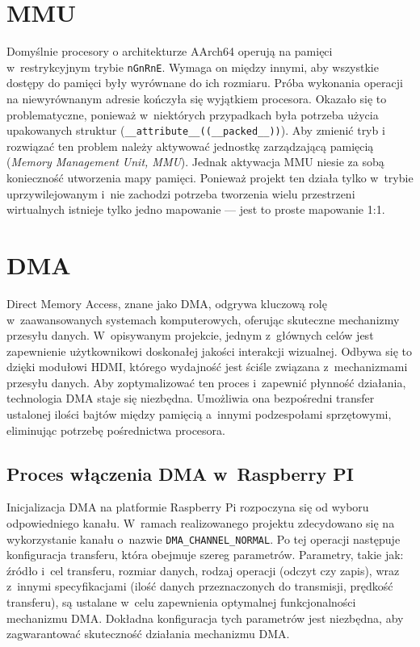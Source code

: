 \documentclass[shortabstract]{iithesis}
\begin{document}
\section{MMU}
Domyślnie procesory o architekturze AArch64 operują na pamięci w~restrykcyjnym trybie \texttt{nGnRnE}. Wymaga on między innymi, aby wszystkie dostępy do pamięci były wyrównane do ich rozmiaru. Próba wykonania operacji na niewyrównanym adresie kończyła się wyjątkiem procesora. Okazało się to problematyczne, ponieważ w~niektórych przypadkach była potrzeba użycia upakowanych struktur (\texttt{\_\_attribute\_\_((\_\_packed\_\_))}). Aby zmienić tryb i rozwiązać ten problem należy aktywować jednostkę zarządzającą pamięcią (\textit{Memory Management Unit, MMU}). Jednak aktywacja MMU niesie za sobą konieczność utworzenia mapy pamięci. Ponieważ projekt ten działa tylko w~trybie uprzywilejowanym i~nie zachodzi potrzeba tworzenia wielu przestrzeni wirtualnych istnieje tylko jedno mapowanie --- jest to proste mapowanie 1:1.

\section{DMA}
Direct Memory Access, znane jako DMA, odgrywa kluczową rolę w~zaawansowanych systemach komputerowych, oferując skuteczne mechanizmy przesyłu danych. W~opisywanym projekcie, jednym z~głównych celów jest zapewnienie użytkownikowi doskonałej jakości interakcji wizualnej. Odbywa się to dzięki modułowi HDMI, którego wydajność jest ściśle związana z~mechanizmami przesyłu danych. Aby zoptymalizować ten proces i~zapewnić płynność działania, technologia DMA staje się niezbędna. Umożliwia ona bezpośredni transfer ustalonej ilości bajtów między pamięcią a~innymi podzespołami sprzętowymi, eliminując potrzebę pośrednictwa procesora.
\subsection{Proces włączenia DMA w~Raspberry PI}
Inicjalizacja DMA na platformie Raspberry Pi rozpoczyna się od wyboru odpowiedniego kanału. W~ramach realizowanego projektu zdecydowano się na wykorzystanie kanału o~nazwie \texttt{DMA\_CHANNEL\_NORMAL}. Po tej operacji następuje konfiguracja transferu, która obejmuje szereg parametrów. Parametry, takie jak: źródło i~cel transferu, rozmiar danych, rodzaj operacji (odczyt czy zapis), wraz z~innymi specyfikacjami (ilość danych przeznaczonych do transmisji, prędkość transferu), są ustalane w~celu zapewnienia optymalnej funkcjonalności mechanizmu DMA. Dokładna konfiguracja tych parametrów jest niezbędna, aby zagwarantować skuteczność działania mechanizmu DMA.
\end{document}
